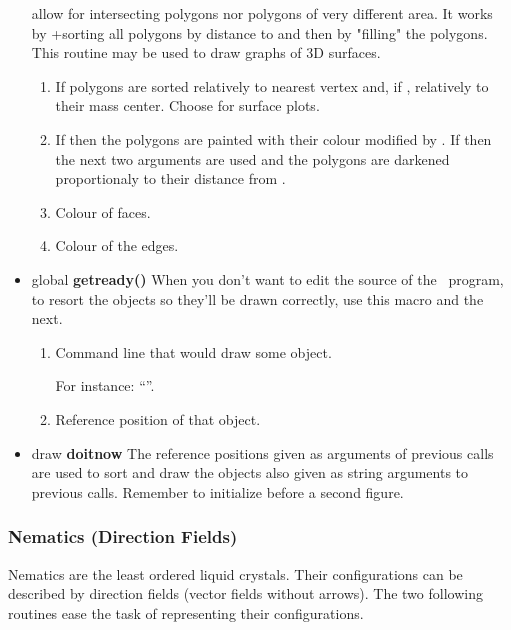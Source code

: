\begin{itemize}
allow for intersecting polygons nor
polygons of very different area. It works by
+sorting all polygons by
distance to  and then by "filling" the
polygons. This routine may be used to draw graphs
of 3D surfaces.
\begin{enumerate}
\item {} If  polygons are
sorted relatively to
nearest vertex and, if , relatively to their
mass center. Choose  for surface
plots.
\item {} If  then the
polygons are painted with their  colour
modified by . If 
then the next two arguments are used and the
polygons are darkened proportionaly to their
distance from .
\item {} Colour of faces.
\item {} Colour of the edges.
\end{enumerate}
\item global {\bfseries getready()} When you don't want to
edit the source of the \MP\ program, to resort the
objects so they'll be drawn correctly, use this macro
and the next.
\begin{enumerate}
\item {} Command line that would draw
some object. 

For instance: ``''.
\item {} Reference position of that
object.
\end{enumerate}
\item draw {\bfseries doitnow} The reference positions
given as arguments of previous  calls
are used to sort and draw the objects also given as
string arguments to previous 
calls. Remember to initialize 
before a second figure.
\end{itemize}


\subsubsection{Nematics (Direction Fields)}

Nematics are the least ordered liquid crystals. Their
configurations can be described by direction fields
(vector fields without arrows). The two following routines
ease the task of representing their configurations.

